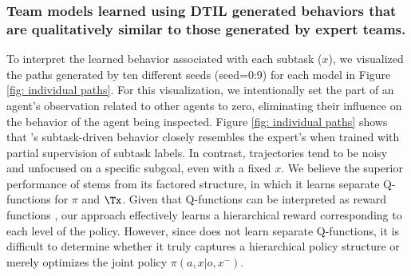\subsubsection{Team models learned using DTIL generated behaviors that are qualitatively similar to those generated by expert teams.}
To interpret the learned behavior associated with each subtask ($x$), we visualized the paths generated by ten different seeds (seed=0:9) for each model in Figure \ref{fig: individual paths}. 
For this visualization, we intentionally set the part of an agent’s observation related to other agents to zero, eliminating their influence on the behavior of the agent being inspected. 
Figure \ref{fig: individual paths} shows that \ouralg's subtask-driven behavior closely resembles the expert's when trained with partial supervision of subtask labels. In contrast, \maogail trajectories tend to be noisy and unfocused on a specific subgoal, even with a fixed $x$. 
We believe the superior performance of \ouralg stems from its factored structure, in which it learns separate Q-functions for $\pi$ and $\Tx$. Given that Q-functions can be interpreted as reward functions \cite{garg2021iq}, our approach effectively learns a hierarchical reward corresponding to each level of the policy. However, since \maogail does not learn separate Q-functions, it is difficult to determine whether it truly captures a hierarchical policy structure or merely optimizes the joint policy $\pi(a, x|o, x^-)$.
